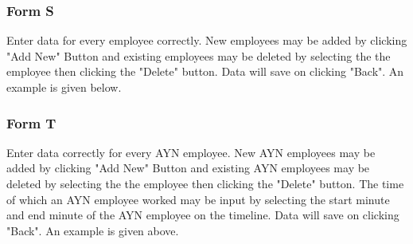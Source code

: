 \documentclass{l3proj}
\begin{document}
\subsubsection{Form S}
Enter data for every employee correctly. New employees may be added by clicking "Add New" Button and existing employees may be deleted by selecting the the employee then clicking the "Delete" button. Data will save on clicking "Back". An example is given below.

\subsubsection{Form T}

Enter data correctly for every AYN employee. New AYN employees may be added by clicking "Add New" Button and existing AYN employees may be deleted by selecting the the employee then clicking the "Delete" button. The time of which an AYN employee worked may be input by selecting the start minute and end minute of the AYN employee on the timeline. Data will save on clicking "Back". An example is given above.



\end{document}
